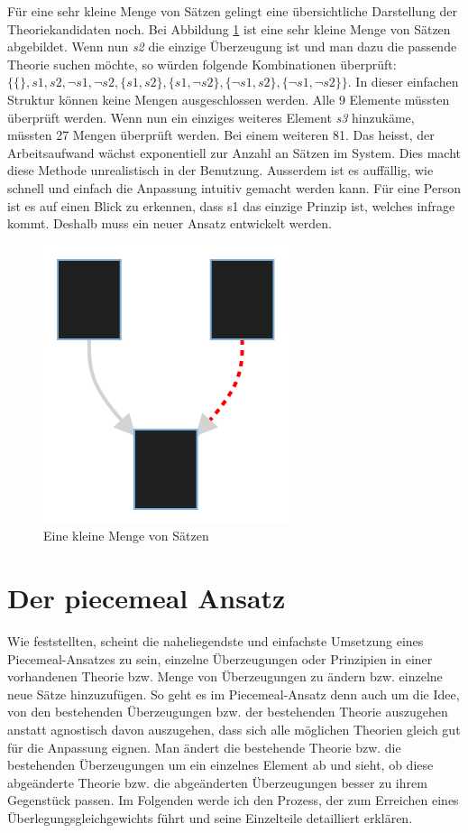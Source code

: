 \documentclass{article}
\begin{document}
Für eine sehr kleine Menge von Sätzen gelingt eine übersichtliche Darstellung der Theoriekandidaten noch. Bei Abbildung \ref{fig:smallset} ist eine sehr kleine Menge von Sätzen abgebildet. Wenn nun \textit{s2} die einzige Überzeugung ist und man dazu die passende Theorie suchen möchte, so würden folgende Kombinationen überprüft: $\{\{\}, s1, s2, \neg s1, \neg s2, \{s1,s2\}, \{s1,\neg s2\}, \{\neg s1, s2 \}, \{\neg s1, \neg s2 \} \}$. In dieser einfachen Struktur können keine Mengen ausgeschlossen werden. Alle 9 Elemente müssten überprüft werden. Wenn nun ein einziges weiteres Element \textit{s3} hinzukäme, müssten 27 Mengen überprüft werden. Bei einem weiteren 81. Das heisst, der Arbeitsaufwand wächst exponentiell zur Anzahl an Sätzen im System. Dies macht diese Methode unrealistisch in der Benutzung. Ausserdem ist es auffällig, wie schnell und einfach die Anpassung intuitiv gemacht werden kann. Für eine Person ist es auf einen Blick zu erkennen, dass s1 das einzige Prinzip ist, welches infrage kommt. Deshalb muss ein neuer Ansatz entwickelt werden.

\begin{figure}[ht]
  \centering
  \includegraphics{figure1}
  \caption{Eine kleine Menge von Sätzen\label{fig:smallset}}
\end{figure}

\section{Der piecemeal Ansatz}
Wie \autocite[S.25]{beisbart_making_2015} feststellten, scheint die naheliegendste und einfachste Umsetzung eines Piecemeal-Ansatzes zu sein, einzelne Überzeugungen oder Prinzipien in einer vorhandenen Theorie bzw. Menge von Überzeugungen zu ändern bzw. einzelne neue Sätze hinzuzufügen. So geht es im Piecemeal-Ansatz denn auch um die Idee, von den bestehenden Überzeugungen bzw. der bestehenden Theorie auszugehen anstatt agnostisch davon auszugehen, dass sich alle möglichen Theorien gleich gut für die Anpassung eignen. Man ändert die bestehende Theorie bzw. die bestehenden Überzeugungen um ein einzelnes Element ab und sieht, ob diese abgeänderte Theorie bzw. die abgeänderten Überzeugungen besser zu ihrem Gegenstück passen. Im Folgenden werde ich den Prozess, der zum Erreichen eines Überlegungsgleichgewichts führt und seine Einzelteile detailliert erklären.
\end{document}
